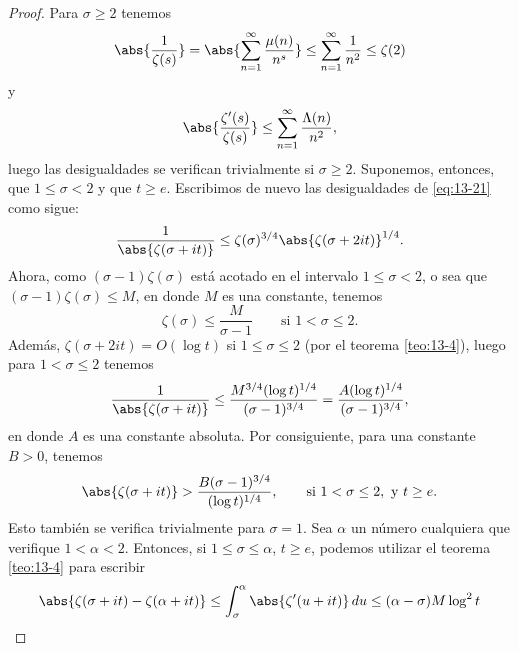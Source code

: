     \begin{proof}
        Para $\sigma\geq2$ tenemos
        \begin{equation*}
            \abs{\frac{1}{\zeta(s)}}=\abs{\sum_{n=1}^{\infty}\frac{\mu(n)}{n^s}}\leq\sum_{n=1}^{\infty}\frac{1}{n^2}\leq\zeta(2)
        \end{equation*}
        y
        \begin{equation*}
            \abs{\frac{\zeta'(s)}{\zeta(s)}}\leq\sum_{n=1}^{\infty}\frac{\Lambda(n)}{n^2},
        \end{equation*}
        luego las desigualdades se verifican trivialmente si $\sigma\geq2$. Suponemos, entonces,
        que $1\leq\sigma<2$ y que $t\geq e$. Escribimos de nuevo las desigualdades de
        \eqref{eq:13-21} como sigue:
        \begin{equation*}
            \frac{1}{\abs{\zeta(\sigma+it)}}\leq\zeta(\sigma)^{3/4}\abs{\zeta(\sigma+2it)}^{1/4}.
        \end{equation*}
        Ahora, como $(\sigma-1)\zeta(\sigma)$ está acotado en el intervalo $1\leq\sigma<2$, o
        sea que $(\sigma-1)\zeta(\sigma)\leq M$, en donde $M$ es una constante, tenemos
        \begin{equation*}
            \zeta(\sigma)\leq\frac{M}{\sigma-1}\qquad\text{si }1<\sigma\leq2.
        \end{equation*}
        Además, $\zeta(\sigma+2it)=O(\log t)$ si $1\leq\sigma\leq2$ (por el teorema
        \ref{teo:13-4}), luego para $1<\sigma\leq2$ tenemos
        \begin{equation*}
            \frac{1}{\abs{\zeta(\sigma+it)}}\leq\frac{M^{3/4}(\log t)^{1/4}}{(\sigma-1)^{3/4}}=\frac{A(\log t)^{1/4}}{(\sigma-1)^{3/4}},
        \end{equation*}
        en donde $A$ es una constante absoluta. Por consiguiente, para una constante $B>0$,
        tenemos
        \begin{equation}\label{eq:13-23}
            \abs{\zeta(\sigma+it)}>\frac{B(\sigma-1)^{3/4}}{(\log t)^{1/4}},\qquad\text{si }1<\sigma\leq2,\text{ y }t\geq e.
        \end{equation}
        Esto también se verifica trivialmente para $\sigma=1$. Sea $\alpha$ un número cualquiera
        que verifique $1<\alpha<2$. Entonces, si $1\leq\sigma\leq\alpha$, $t\geq e$, podemos
        utilizar el teorema \ref{teo:13-4} para escribir
        \begin{align*}
            \abs{\zeta(\sigma+it)-\zeta(\alpha+it)}&\leq\int_{\sigma}^{\alpha}\abs{\zeta'(u+it)}\,du\leq(\alpha-\sigma)M\log^2t\\

\end{align*}
\end{proof}
